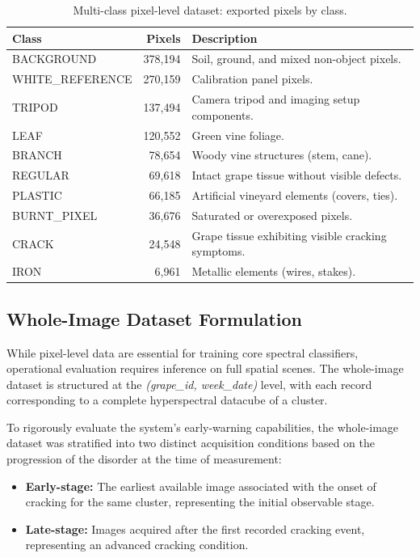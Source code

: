 \begin{table}[htbp]
\centering
\caption[Multi-class pixel dataset: class distribution]{Multi-class pixel-level dataset: exported pixels by class.}
\label{tab:multiclass_pixel_distribution}
\small
\setlength{\tabcolsep}{6pt}
\begin{tabularx}{\linewidth}{@{} l r X @{}}
\toprule
\textbf{Class} & \textbf{Pixels} & \textbf{Description} \\
\midrule
BACKGROUND       & 378{,}194 & Soil, ground, and mixed non-object pixels. \\
WHITE\_REFERENCE & 270{,}159 & Calibration panel pixels. \\
TRIPOD          & 137{,}494 & Camera tripod and imaging setup components. \\
LEAF            & 120{,}552 & Green vine foliage. \\
BRANCH           & 78{,}654 & Woody vine structures (stem, cane). \\
REGULAR          & 69{,}618 & Intact grape tissue without visible defects. \\
PLASTIC          & 66{,}185 & Artificial vineyard elements (covers, ties). \\
BURNT\_PIXEL      & 36{,}676 & Saturated or overexposed pixels. \\
CRACK            & 24{,}548 & Grape tissue exhibiting visible cracking symptoms. \\
IRON              & 6{,}961 & Metallic elements (wires, stakes). \\
\bottomrule
\end{tabularx}
\end{table}

\subsection{Whole-Image Dataset Formulation}
\label{subsec:whole_image_dataset}

\noindent
While pixel-level data are essential for training core spectral classifiers, operational evaluation requires inference on full spatial scenes. The whole-image dataset is structured at the \emph{(grape\_id, week\_date)} level, with each record corresponding to a complete hyperspectral datacube of a cluster.

\medskip
\noindent
To rigorously evaluate the system's early-warning capabilities, the whole-image dataset was stratified into two distinct acquisition conditions based on the progression of the disorder at the time of measurement:
\begin{itemize}
    \item \textbf{Early-stage:} The earliest available image associated with the onset of cracking for the same cluster, representing the initial observable stage.
    \item \textbf{Late-stage:} Images acquired after the first recorded cracking event, representing an advanced cracking condition.
\end{itemize}

